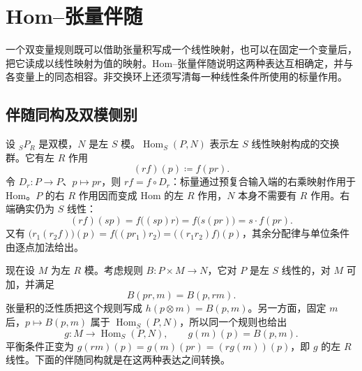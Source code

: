 
\section{Hom–张量伴随}
\label{b2:sec:0603}

一个双变量规则既可以借助张量积写成一个线性映射，也可以在固定一个变量后，把它读成以线性映射为值的映射。Hom–张量伴随说明这两种表达互相确定，并与各变量上的同态相容。非交换环上还须写清每一种线性条件所使用的标量作用。

%
%

\subsection{伴随同构及双模侧别}
\label{b2:subsec:0603:01}

设 \({}_SP_R\) 是双模，\(N\) 是左 \(S\) 模。\(\operatorname{Hom}_S(P,N)\) 表示左 \(S\) 线性映射构成的交换群。它有左 \(R\) 作用
\begin{equation}\label{b2:eq:hom-left-action}
	(rf)(p)\coloneqq f(pr).
\end{equation}
令 \(D_r:P\to P\)、\(p\mapsto pr\)，则 \(rf=f\circ D_r\)：标量通过预复合输入端的右乘映射作用于 Hom。\(P\) 的右 \(R\) 作用因而变成 Hom 的左 \(R\) 作用，\(N\) 本身不需要有 \(R\) 作用。右端确实仍为 \(S\) 线性：
\[
	(rf)(sp)=f\bigl((sp)r\bigr)=f\bigl(s(pr)\bigr)=s\cdot f(pr).
\]
又有 \(\bigl(r_1(r_2f)\bigr)(p)=f\bigl((pr_1)r_2\bigr)=\bigl((r_1r_2)f\bigr)(p)\)，其余分配律与单位条件由逐点加法给出。

\ProseParagraphBreak
现在设 \(M\) 为左 \(R\) 模。考虑规则 \(B:P\times M\to N\)，它对 \(P\) 是左 \(S\) 线性的，对 \(M\) 可加，并满足
\[
	B(pr,m)=B(p,rm).
\]
张量积的泛性质把这个规则写成 \(h(p\otimes m)=B(p,m)\)。另一方面，固定 \(m\) 后，\(p\mapsto B(p,m)\) 属于 \(\operatorname{Hom}_S(P,N)\)，所以同一个规则也给出
\[
	g:M\longrightarrow\operatorname{Hom}_S(P,N),\qquad g(m)(p)=B(p,m).
\]
平衡条件正变为 \(g(rm)(p)=g(m)(pr)=(rg(m))(p)\)，即 \(g\) 的左 \(R\) 线性。下面的伴随同构就是在这两种表达之间转换。

